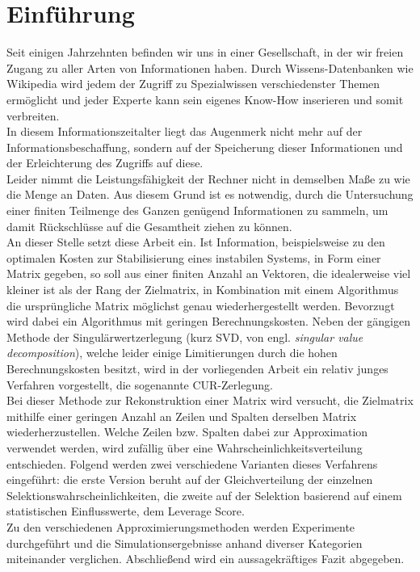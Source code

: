 \documentclass[12pt,a4paper,twoside]{article}
\begin{document}
\newpage
\tableofcontents
\newpage

\pagestyle{headings}

\section{Einführung}
	Seit einigen Jahrzehnten befinden wir uns in einer Gesellschaft, in der wir freien Zugang zu aller Arten von 
	Informationen haben. Durch Wissens-Datenbanken wie Wikipedia wird jedem der Zugriff zu Spezialwissen verschiedenster Themen ermöglicht und jeder Experte kann sein eigenes Know-How inserieren und somit verbreiten.
	\\
	In diesem Informationszeitalter liegt das Augenmerk nicht 
	mehr auf der Informationsbeschaffung, sondern auf der Speicherung dieser Informationen und der Erleichterung des 
	Zugriffs auf diese. \\
	Leider nimmt die Leistungsfähigkeit der Rechner nicht in demselben Maße zu wie die Menge an Daten. Aus diesem 
	Grund ist es notwendig, durch die Untersuchung einer finiten Teilmenge des Ganzen genügend Informationen zu 
	sammeln, um damit Rückschlüsse auf die Gesamtheit ziehen zu können. \\
	An dieser Stelle setzt diese Arbeit ein. Ist Information, beispielsweise zu den optimalen Kosten zur Stabilisierung eines instabilen Systems, in Form einer Matrix gegeben, so soll aus einer finiten Anzahl an Vektoren, die idealerweise viel kleiner ist als der Rang der Zielmatrix, in Kombination mit einem Algorithmus die ursprüngliche Matrix möglichst genau wiederhergestellt werden. Bevorzugt wird dabei ein Algorithmus mit geringen Berechnungskosten.
	Neben der gängigen Methode der Singulärwertzerlegung (kurz SVD, von engl. \textit{singular value decomposition}), welche leider einige Limitierungen durch die hohen Berechnungskosten besitzt, wird in der vorliegenden Arbeit ein relativ junges Verfahren vorgestellt, die sogenannte CUR-Zerlegung. \\
	Bei dieser Methode zur Rekonstruktion einer Matrix wird versucht, die Zielmatrix mithilfe einer geringen Anzahl 
	an Zeilen und Spalten derselben Matrix wiederherzustellen. Welche Zeilen bzw. Spalten dabei zur Approximation 
	verwendet werden, wird zufällig über eine Wahrscheinlichkeitsverteilung entschieden. Folgend werden zwei 
	verschiedene Varianten dieses Verfahrens eingeführt: die erste Version beruht auf der Gleichverteilung der einzelnen Selektionswahrscheinlichkeiten, die zweite auf der Selektion basierend auf einem statistischen Einflusswerte, dem Leverage Score. \\
	Zu den verschiedenen Approximierungsmethoden werden Experimente durchgeführt und die Simulationsergebnisse
	anhand diverser Kategorien miteinander verglichen. Abschließend wird ein aussagekräftiges Fazit abgegeben.
	\newpage
\end{document}
